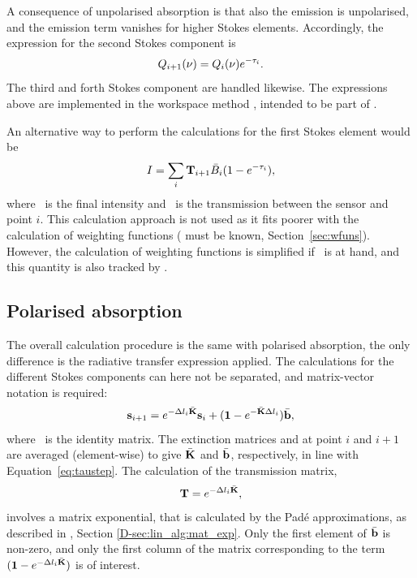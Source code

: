 A consequence of unpolarised absorption is that also the emission is
unpolarised, and the emission term vanishes for higher Stokes elements.
Accordingly, the expression for the second Stokes component is
\begin{equation}
  Q_{i+1}(\nu) = Q_{i}(\nu)e^{-\tau_{i}}.
  \label{eq:fm_defs:rte_step2}
\end{equation}
The third and forth Stokes component are handled likewise. The expressions
above are implemented in the workspace method ,
intended to be part of .

An alternative way to perform the calculations for the first Stokes element
would be
\begin{equation}
  \label{eq:fm_defs:rte_alt}
  I = \sum_i \mathbf{T}_{i+1} \bar{B}_i(1-e^{-\tau_{i}}),
\end{equation}
where \StoI\ is the final intensity and \ is the transmission
between the sensor and point $i$. This calculation approach is not used as it
fits poorer with the calculation of weighting functions ( must be
known, Section~\ref{sec:wfuns}). However, the calculation of weighting
functions is simplified if \ is at hand, and this quantity is
also tracked by .


\subsection{Polarised absorption}

The overall calculation procedure is the same with polarised absorption, the
only difference is the radiative transfer expression applied. The calculations
for the different Stokes components can here not be separated, and
matrix-vector notation is required: 
\begin{equation}
  \label{eq:fm_defs:vrte_step}
  {\bf s}_{i+1} = e^{-\Delta l_{i}\bar{{\bf K}}} {\bf s}_{i} + 
                  (\mathbf{1}-e^{-\bar{{\bf K}}\Delta l_{i}})\bar{{\bf b}},
\end{equation}
where \IdnMtr\ is the identity matrix. The extinction matrices and 
at point $i$ and $i+1$ are averaged (element-wise) to give $\bar{{\bf K}}$ and
$\bar{{\bf b}}$, respectively, in line with Equation~\ref{eq:taustep}. The
calculation of the transmission matrix,
\begin{equation}
  \mathbf{T} = e^{-\Delta l_{i}\bar{{\bf K}}},
  \label{eq:rte:transmat}
\end{equation}
involves a matrix exponential, that is calculated by the Pad\'e approximations,
as described in \developer, Section \ref{D-sec:lin_alg:mat_exp}. Only the first
element of $\bar{{\bf b}}$ is non-zero, and only the first column of the matrix
corresponding to the term $(\mathbf{1}-e^{-\Delta l_{i}\bar{{\bf K}}})$ is
of interest.



